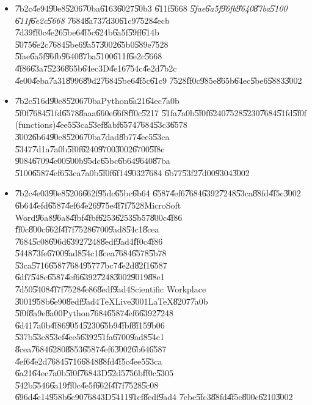 \documentclass[12pt,a4paper]{article}
\begin{document}
\begin{itemize}
\item \U{7b2c}\U{4e94}\U{90e8}\U{5206}\U{70ba}\U{6163}\U{6027}\U{50b3}%
\U{611f}\U{5668} \textit{\U{5fae}\U{6a5f}\U{96fb}\U{9640}\U{87ba}\U{5100}%
\U{611f}\U{6e2c}\U{5668} }\U{7684}\U{8a73}\U{7d30}\U{61c9}\U{7528}\U{4ecb}%
\U{7d39}\U{ff0c}\U{4e26}\U{5be6}\U{4f5c}\U{624b}\U{6a5f}\U{59ff}\U{614b}%
\U{5075}\U{6e2c}\U{7684}\U{5be6}\U{9a57}\U{3002}\U{65b0}\U{589e}\U{7528}%
\U{5fae}\U{6a5f}\U{96fb}\U{9640}\U{87ba}\U{5100}\U{611f}\U{6e2c}\U{5668}%
\U{4f86}\U{63a7}\U{5236}\U{865b}\U{64ec}3D\U{4e16}\U{754c}\U{4e2d}\U{7b2c}%
\U{4e00}\U{4eba}\U{7a31}\U{8996}\U{89d2}\U{7684}\U{5be6}\U{4f5c}\U{61c9}%
\U{7528}\U{ff0c}\U{985e}\U{865b}\U{64ec}\U{5be6}\U{5883}\U{3002}

\item \U{7b2c}\U{516d}\U{90e8}\U{5206}\U{70ba}Python\U{6a21}\U{64ec}\U{7a0b}%
\U{5f0f}\U{7684}\U{51fd}\U{6578}\U{8aaa}\U{660e}\U{66f8}\U{ff0c}\U{5217}%
\U{51fa}\U{7a0b}\U{5f0f}\U{6240}\U{7528}\U{5230}\U{7684}\U{51fd}\U{5f0f}%
(functions)\U{4ee5}\U{53ca}\U{53ef}\U{8abf}\U{6574}\U{7684}\U{53c3}\U{6578}%
\U{3002}\U{6b64}\U{90e8}\U{5206}\U{70ba}\U{7dad}\U{8b77}\U{4ee5}\U{53ca}%
\U{5347}\U{7d1a}\U{7a0b}\U{5f0f}\U{6240}\U{9700}\U{3002}\U{6700}\U{5f8c}%
\U{9084}\U{6709}\U{4e00}\U{500b}\U{95dc}\U{65bc}\U{6b64}\U{9640}\U{87ba}%
\U{5100}\U{6587}\U{4ef6}\U{53ca}\U{7a0b}\U{5f0f}\U{6f14}\U{9032}\U{7684}%
\U{6b77}\U{53f2}\U{7d00}\U{9304}\U{3002}

\item \U{7b2c}\U{4e03}\U{90e8}\U{5206}\U{662f}\U{95dc}\U{65bc}\U{6b64}%
\U{6587}\U{4ef6}\U{7684}\U{6392}\U{7248}\U{53ca}\U{88fd}\U{4f5c}\U{3002}%
\U{6b64}\U{4efd}\U{6587}\U{4ef6}\U{4e26}\U{975e}\U{4f7f}\U{7528}MicroSoft
Word\U{96a8}\U{96a8}\U{4fbf}\U{4fbf}\U{6253}\U{6253}\U{5b57}\U{800c}\U{4f86}%
\U{ff0c}\U{800c}\U{662f}\U{4f7f}\U{7528}\U{6700}\U{9ad8}\U{54c1}\U{8cea}%
\U{7684}\U{5c08}\U{696d}\U{6392}\U{7248}\U{8edf}\U{9ad4}\U{ff0c}\U{4f86}%
\U{5448}\U{73fe}\U{6700}\U{9ad8}\U{54c1}\U{8cea}\U{7684}\U{6578}\U{5b78}%
\U{53ca}\U{5716}\U{6587}\U{7684}\U{9577}\U{7bc7}\U{4e2d}\U{82f1}\U{6587}%
\U{6df7}\U{548c}\U{6587}\U{4ef6}\U{6392}\U{7248}\U{3002}\U{9019}\U{88e1}%
\U{7d50}\U{5408}\U{4f7f}\U{7528}\U{4e86}\U{8edf}\U{9ad4}Scientific Workplace%
\U{3001}\U{958b}\U{6e90}\U{8edf}\U{9ad4}TeXLive\U{3001}LaTeX\U{8207}\U{7a0b}%
\U{5f0f}\U{8a9e}\U{8a00}Python\U{7684}\U{6587}\U{4ef6}\U{6392}\U{7248}%
\U{6d41}\U{7a0b}\U{4f86}\U{9054}\U{5230}\U{65b9}\U{4fbf}\U{8f15}\U{9b06}%
\U{537b}\U{53c8}\U{53ef}\U{4ee5}\U{6392}\U{51fa}\U{6700}\U{9ad8}\U{54c1}%
\U{8cea}\U{7684}\U{6280}\U{8853}\U{6587}\U{4ef6}\U{3002}\U{6b64}\U{6587}%
\U{4ef6}\U{4e2d}\U{7684}\U{5716}\U{6848}\U{88fd}\U{4f5c}\U{4ee5}\U{53ca}%
\U{6a21}\U{64ec}\U{7a0b}\U{5f0f}\U{7684}3D\U{52d5}\U{756b}\U{ff0c}\U{5305}%
\U{542b}\U{5546}\U{6a19}\U{ff0c}\U{4e5f}\U{662f}\U{4f7f}\U{7528}\U{5c08}%
\U{696d}\U{4e14}\U{958b}\U{6e90}\U{7684}3D\U{5411}\U{91cf}\U{8edf}\U{9ad4}%
\U{7cbe}\U{5fc3}\U{88fd}\U{4f5c}\U{800c}\U{6210}\U{3002}
\end{itemize}
\end{document}
